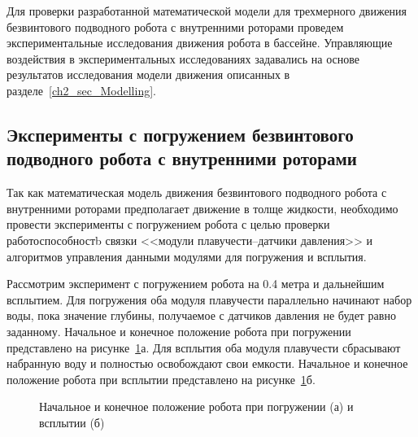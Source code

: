 Для проверки разработанной математической модели для трехмерного движения безвинтового подводного робота с внутренними роторами проведем экспериментальные исследования движения робота в бассейне. Управляющие воздействия в экспериментальных исследованиях задавались на основе результатов исследования модели движения описанных в разделе~\ref{ch2_sec_Modelling}.

\subsection{Эксперименты с погружением безвинтового подводного робота с внутренними роторами}

Так как математическая модель движения безвинтового подводного робота с внутренними роторами предполагает движение в толще жидкости, необходимо провести эксперименты с погружением робота с целью проверки работоспособностb связки <<модули плавучести--датчики давления>> и алгоритмов управления данными модулями для погружения и всплытия.

Рассмотрим эксперимент с погружением робота на 0.4 метра и дальнейшим всплытием. Для погружения оба модуля плавучести параллельно начинают набор воды, пока значение глубины, получаемое с датчиков давления не будет равно заданному. Начальное и конечное положение робота при погружении представлено на рисунке~\ref{BPRUpDown}а. Для всплытия оба модуля плавучести сбрасывают набранную воду и полностью освобождают свои емкости. Начальное и конечное положение робота при всплытии представлено на рисунке~\ref{BPRUpDown}б.

\begin{figure}[!ht]
	\begin{minipage}[h]{0.5\linewidth}
	\end{minipage}
	\hfill
	\begin{minipage}[h]{0.5\linewidth}
	\end{minipage}
	
	\begin{minipage}[h]{0.5\linewidth}
	\end{minipage}
	\hfill
	\begin{minipage}[h]{0.5\linewidth}
	\end{minipage}
	
	\caption{Начальное и конечное положение робота при погружении (а) и всплытии (б)}
	\label{BPRUpDown}
\end{figure}

